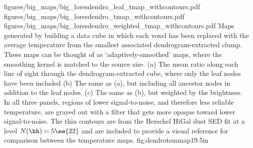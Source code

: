 \RotFigureThreeAA
{figures/big_maps/big_loresdendro_leaf_tmap_withcontours.pdf}
{figures/big_maps/big_loresdendro_tmap_withcontours.pdf}
{figures/big_maps/big_loresdendro_weighted_tmap_withcontours.pdf}
{Maps generated by building a data cube in which each voxel has been replaced
with the average temperature from the smallest associated dendrogram-extracted
clump.  These maps can be thought of as `adaptively-smoothed' maps, where the
smoothing kernel is matched to the source size.
(a) The mean ratio along each line of sight through the dendrogram-extracted
cube, where only the leaf nodes have been included
\newline
(b) The same as (a), but including all ancestor nodes in addition to the leaf
nodes. 
\newline
(c) The same as (b), but weighted by the \threeohthree brightness.
\newline
In all three panels, regions of lower signal-to-noise, and therefore less
reliable
temperature, are grayed out with a filter that gets more opaque toward lower
signal-to-noise.  The thin contours are from the Herschel HiGal
dust SED fit at a level $N(\hh)=5\ee{22}$ \percc and are included to provide a
visual reference for comparison between the temperature maps.
}
{fig:dendrotemmap}{1}{9.5in}

% 
% 

